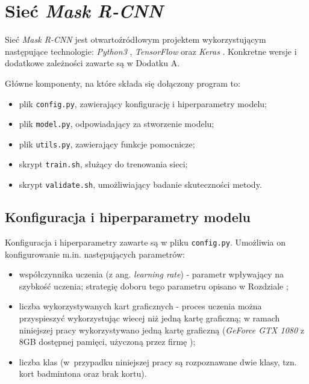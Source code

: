\newpage
\section{Sieć \textit{Mask R-CNN}}

Sieć \textit{Mask R-CNN} \cite{matterport-mask-rcnn} jest otwartoźródłowym projektem wykorzystującym następujące technologie: \textit{Python3} \cite{python}, \textit{TensorFlow} \cite{tensorflow} oraz \textit{Keras} \cite{keras}. Konkretne wersje i dodatkowe zależności zawarte są w Dodatku A.

Główne komponenty, na które składa się dołączony program to:

\begin{itemize}
  \item plik \texttt{config.py}, zawierający konfigurację i hiperparametry modelu;
  \item plik \texttt{model.py}, odpowiadający za stworzenie modelu;
  \item plik \texttt{utils.py}, zawierający funkcje pomocnicze;
  \item skrypt \texttt{train.sh}, służący do trenowania sieci;
  \item skrypt \texttt{validate.sh}, umożliwiający badanie skuteczności metody.
\end{itemize}

\subsection*{Konfiguracja i hiperparametry modelu}

Konfiguracja i hiperparametry zawarte są w pliku \texttt{config.py}. Umożliwia on konfigurowanie m.in. następujących parametrów:
\begin{itemize}
  \item współczynnika uczenia (z ang. \textit{learning rate}) - parametr wpływający na szybkość uczenia; strategię doboru tego parametru opisano w Rozdziale ;
  \item liczba wykorzystywanych kart graficznych - proces uczenia można przyspieszyć wykorzystując wiecej niż jedną kartę graficzną; w ramach niniejszej pracy wykorzystywano jedną kartę graficzną (\textit{GeForce GTX 1080} z 8GB dostępnej pamięci, użyczoną przez firmę \blue{});
  \item liczba klas (w~przypadku niniejszej pracy są rozpoznawane dwie klasy, tzn. kort badmintona oraz brak kortu).
\end{itemize}

